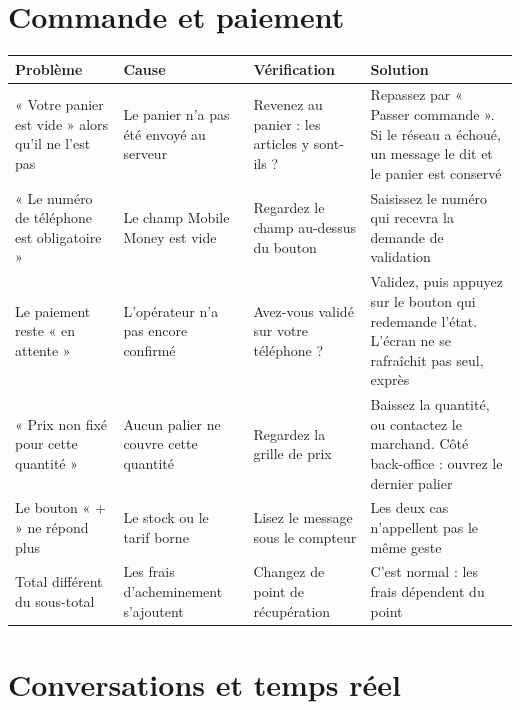 \documentclass[11pt,a4paper]{report}
\begin{document}
\section{Commande et paiement}

\begin{longtable}{@{}p{3.6cm} p{3.4cm} p{3.4cm} p{3.8cm}@{}}
\toprule
\bfseries Problème & \bfseries Cause & \bfseries Vérification & \bfseries Solution \\
\midrule
\endhead
« Votre panier est vide » alors qu'il ne l'est pas
  & Le panier n'a pas été envoyé au serveur
  & Revenez au panier : les articles y sont-ils ?
  & Repassez par « Passer commande ». Si le réseau a échoué, un message le dit
    et le panier est conservé \\[4pt]
« Le numéro de téléphone est obligatoire »
  & Le champ Mobile Money est vide
  & Regardez le champ au-dessus du bouton
  & Saisissez le numéro qui recevra la demande de validation \\[4pt]
Le paiement reste « en attente »
  & L'opérateur n'a pas encore confirmé
  & Avez-vous validé sur votre téléphone ?
  & Validez, puis appuyez sur le bouton qui redemande l'état. L'écran ne se
    rafraîchit pas seul, exprès \\[4pt]
« Prix non fixé pour cette quantité »
  & Aucun palier ne couvre cette quantité
  & Regardez la grille de prix
  & Baissez la quantité, ou contactez le marchand. Côté back-office : ouvrez
    le dernier palier \\[4pt]
Le bouton « + » ne répond plus
  & Le stock ou le tarif borne
  & Lisez le message sous le compteur
  & Les deux cas n'appellent pas le même geste \\[4pt]
Total différent du sous-total
  & Les frais d'acheminement s'ajoutent
  & Changez de point de récupération
  & C'est normal : les frais dépendent du point \\
\bottomrule
\end{longtable}

\section{Conversations et temps réel}
\end{document}
